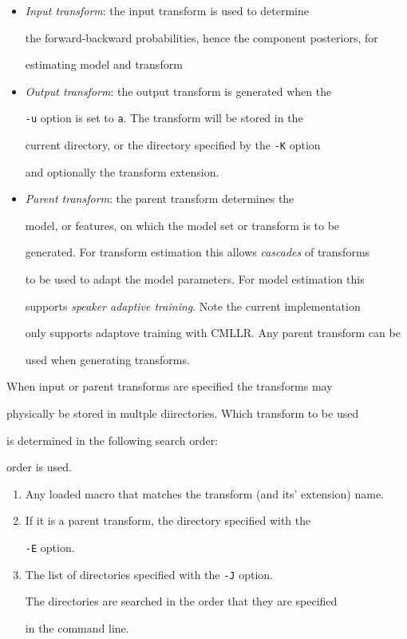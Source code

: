 \begin{itemize}


\item {\it Input transform}: the input transform is used to determine


the forward-backward probabilities, hence the component posteriors, for 


estimating model and transform 


\item {\it Output transform}: the output transform is generated when the 


{\tt -u} option is set to {\tt a}. The transform will be stored in the 


current directory, or the directory specified by the {\tt -K} option


and optionally the transform extension.


\item {\it Parent transform}: the parent transform determines the 


model, or features, on which the model set or transform is to be 


generated. For transform estimation this allows {\em cascades} of transforms


to be used to adapt the model parameters. For model estimation this 


supports {\em speaker adaptive training}. Note the current implementation 


only supports adaptove training with CMLLR. Any parent transform can be


used when generating transforms.


\end{itemize}


When input or parent transforms are specified the transforms may 


physically be stored in multple diirectories. Which transform to be used 


is determined in the following search order:


order is used.


\begin{enumerate}


\item Any loaded macro that matches the transform (and its' extension) name.


\item If it is a parent transform, the directory specified with the 


{\tt -E} option.


\item The list of directories specified with the {\tt -J} option.


The directories are searched in the order that they are specified


in the command line.


\end{enumerate}


